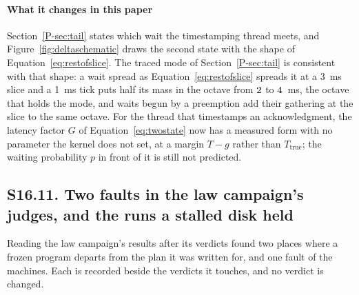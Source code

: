 \documentclass[10pt,journal,onecolumn]{IEEEtran}
\newcommand{\mainSpectrum}{\ref{P-sec:tail}}        %
\begin{document}
\paragraph{What it changes in this paper} Section~\mainSpectrum{} states which wait the
timestamping thread meets, and Figure~\ref{fig:deltaschematic} draws the second state with the
shape of Equation~\ref{eq:restofslice}. The traced mode of Section~\mainSpectrum{} is consistent
with that shape: a wait spread as Equation~\ref{eq:restofslice} spreads it at a 3~ms slice and a
1~ms tick puts half its mass in the octave from $2$ to $4$~ms, the octave that holds the mode, and
waits begun by a preemption add their gathering at the slice to the same octave. For the thread
that timestamps an acknowledgment, the latency factor $G$ of Equation~\ref{eq:twostate} now has a
measured form with no parameter the kernel does not set, at a margin $T - g$ rather than
$T_{\mathrm{true}}$; the waiting probability $p$ in front of it is still not predicted.

\subsection{S16.11. Two faults in the law campaign's judges, and the runs a stalled disk held}
\label{sec:lawjudges}

Reading the law campaign's results after its verdicts found two places where a frozen program
departs from the plan it was written for, and one fault of the machines. Each is recorded beside
the verdicts it touches, and no verdict is changed.
\end{document}
